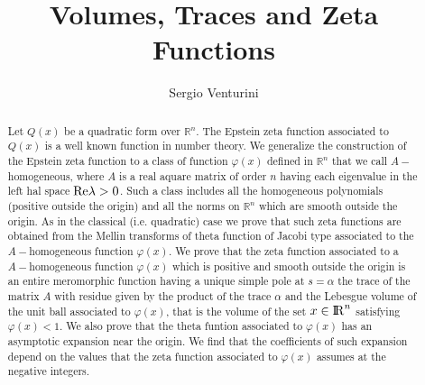 \documentclass[12pt,a4paper]{amsart}
\begin{document}
\title{Volumes, Traces and Zeta Functions}
\author{Sergio Venturini}

\address{S. Venturini: Dipartimento Di Matematica, Universit\`{a} di Bologna, \,\,Piazza di Porta S. Donato 5 ---
I-40127 Bologna, Italy}


\maketitle

\newtheorem{theorem}{Theorem}[section]
\newtheorem{proposition}{Proposition}[section]
\newtheorem{lemma}{Lemma}[section]
\newtheorem{corollary}{Corollary}[section]
\newtheorem{remark}{Remark}[section]
\newtheorem{definition}{Definition}[section]

\newtheorem{teorema}{Teorema}[section]
\newtheorem{proposizione}{Proposizione}[section]
\newtheorem{corollario}{Corollario}[section]
\newtheorem{osservazione}{Osservazione}[section]
\newtheorem{definizione}{Definizione}[section]
\newtheorem{esempio}{Esempio}[section]
\newtheorem{esercizio}{Esercizio}[section]
\newtheorem{congettura}{Congettura}[section]



\begin{abstract}
Let $Q(x)$ be a quadratic form over $\mathbb{R}^n$.
The Epstein zeta function associated to $Q(x)$ is a 
well known function in number theory.
We generalize the construction of the Epstein zeta function to a class
of function $\varphi(x)$ defined in $\mathbb{R}^n$ that we call $A-$homogeneous,
where $A$ is a real aquare matrix of order $n$
having each eigenvalue in the left hal space ${\mathop{\rm Re}\nolimits}\lambda>0$.
Such a class includes
all the homogeneous polynomials (positive outside the origin)
and all the norms on $\mathbb{R}^n$ which are smooth outside the origin.
As in the classical (i.e. quadratic) case we prove that such zeta functions
are obtained from the Mellin transforms of theta function of Jacobi type
associated to the $A-$homogeneous function $\varphi(x)$.
We prove that the zeta function associated to a $A-$homogeneous function $\varphi(x)$
which is positive and smooth outside the origin is an entire meromorphic function
having a unique simple pole at $s=\alpha$ the trace of the matrix $A$ with residue
given by the product of the trace $\alpha$ and the Lebesgue volume of the
unit ball associated to $\varphi(x)$, that is the volume of the set $x\in{{\rm I\kern-.185em R}}^n$
satisfying $\varphi(x)<1$.
We also prove that the theta funtion associated to $\varphi(x)$ has an asymptotic 
expansion near the origin. We find that the coefficients of such expansion
depend on the values that the zeta function associated to $\varphi(x)$ assumes
at the negative integers.

\end{abstract}
\end{document}
